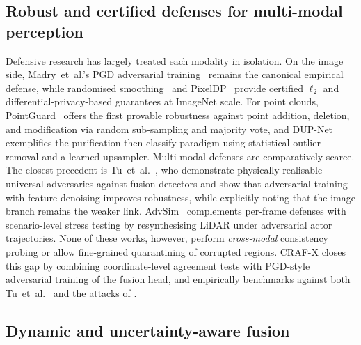 \subsection{Robust and certified defenses for multi-modal perception}

Defensive research has largely treated each modality in isolation.
On the image side, Madry~et~al.'s PGD adversarial
training~\cite{MadryPGD2018} remains the canonical empirical defense,
while randomised smoothing~\cite{CohenSmoothing2019} and
PixelDP~\cite{LecuyerPixelDP2019} provide certified $\ell_2$ and
differential-privacy-based guarantees at ImageNet scale. For point
clouds, PointGuard~\cite{LiuPointGuard2021} offers the first provable
robustness against point addition, deletion, and modification via
random sub-sampling and majority vote, and DUP-Net~\cite{ZhouDUPNet2019}
exemplifies the purification-then-classify paradigm using statistical
outlier removal and a learned upsampler.
Multi-modal defenses are comparatively scarce. The closest precedent is
Tu~et~al.~\cite{TuMultiSensor2021}, who demonstrate physically realisable
universal adversaries against fusion detectors and show that
adversarial training with feature denoising improves robustness, while
explicitly noting that the image branch remains the weaker link.
AdvSim~\cite{WangAdvSim2021} complements per-frame defenses with
scenario-level stress testing by resynthesising LiDAR under adversarial
actor trajectories. None of these works, however, perform
\emph{cross-modal} consistency probing or allow fine-grained
quarantining of corrupted regions. CRAF-X closes this gap by combining
coordinate-level agreement tests with PGD-style adversarial training of
the fusion head, and empirically benchmarks against both
Tu~et~al.~\cite{TuMultiSensor2021} and the attacks of
\cite{CaoMSFADV2021,HallyburtonFrustum2022,ChengFusion2024}.

\subsection{Dynamic and uncertainty-aware fusion}

